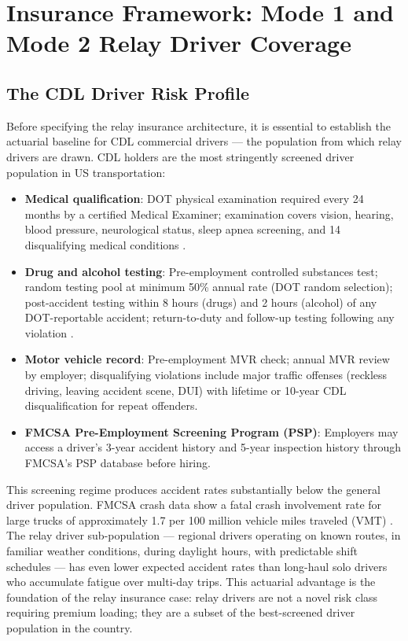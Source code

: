 \section{Insurance Framework: Mode 1 and Mode 2 Relay Driver Coverage}
\label{sec:insurance}

\subsection{The CDL Driver Risk Profile}

Before specifying the relay insurance architecture, it is essential to establish the actuarial baseline for CDL commercial drivers --- the population from which relay drivers are drawn. CDL holders are the most stringently screened driver population in US transportation:

\begin{itemize}
  \item \textbf{Medical qualification}: DOT physical examination required every 24 months by a certified Medical Examiner; examination covers vision, hearing, blood pressure, neurological status, sleep apnea screening, and 14 disqualifying medical conditions \citep{FMCSA_HOS2022}.
  \item \textbf{Drug and alcohol testing}: Pre-employment controlled substances test; random testing pool at minimum 50\% annual rate (DOT random selection); post-accident testing within 8 hours (drugs) and 2 hours (alcohol) of any DOT-reportable accident; return-to-duty and follow-up testing following any violation \citep{FMCSA_HOS2022}.
  \item \textbf{Motor vehicle record}: Pre-employment MVR check; annual MVR review by employer; disqualifying violations include major traffic offenses (reckless driving, leaving accident scene, DUI) with lifetime or 10-year CDL disqualification for repeat offenders.
  \item \textbf{FMCSA Pre-Employment Screening Program (PSP)}: Employers may access a driver's 3-year accident history and 5-year inspection history through FMCSA's PSP database before hiring.
\end{itemize}

This screening regime produces accident rates substantially below the general driver population. FMCSA crash data show a fatal crash involvement rate for large trucks of approximately 1.7 per 100 million vehicle miles traveled (VMT) \citep{FMCSA_HOS2022}. The relay driver sub-population --- regional drivers operating on known routes, in familiar weather conditions, during daylight hours, with predictable shift schedules --- has even lower expected accident rates than long-haul solo drivers who accumulate fatigue over multi-day trips. This actuarial advantage is the foundation of the relay insurance case: relay drivers are not a novel risk class requiring premium loading; they are a subset of the best-screened driver population in the country.

